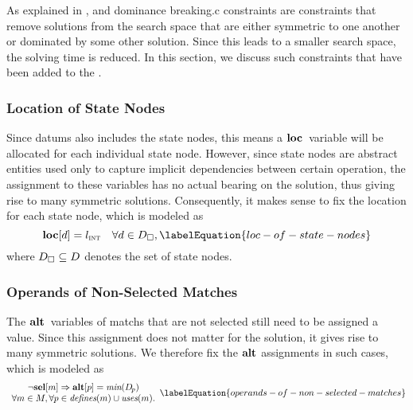 As explained in ,  and \gls{dominance breaking.c} \glspl{constraint} are
\glspl{constraint} that remove \glspl{solution} from the \gls{search space} that
are either symmetric to one another or dominated by some other \gls{solution}.
%
Since this leads to a smaller \gls{search space}, the solving time is reduced.
%
In this section, we discuss such \glspl{constraint} that have been added to the
.


\subsubsection{Location of State Nodes}

Since \glspl{datum} also includes the \glspl{state node}, this means a
$\mVar{loc}$~\gls{variable} will be allocated for each individual \gls{state
  node}.
%
However, since \glspl{state node} are abstract entities used only to capture
implicit dependencies between certain \gls{operation}, the assignment to these
\glspl{variable} has no actual bearing on the \gls{solution}, thus giving rise
to many symmetric \glspl{solution}.
%
Consequently, it makes sense to fix the location for each \gls{state node},
which is modeled as
%
\begin{equation}
  \mVar{loc}[d] = \mIntLocation
  \mQuantSep
  \forall d \in \mStateDataSet,
  \labelEquation{loc-of-state-nodes}
\end{equation}
%
where \mbox{$\mStateDataSet \subseteq \mDataSet$} denotes the set of
\glspl{state node}.


\subsubsection{Operands of Non-Selected Matches}

The $\mVar{alt}$~\glspl{variable} of \glspl{match} that are not selected still
need to be assigned a value.
%
Since this assignment does not matter for the \gls{solution}, it gives rise to
many symmetric \glspl{solution}.
%
We therefore fix the $\mVar{alt}$ assignments in such cases, which is modeled as
%
\begin{equation}
  \begin{array}{c}
    \neg\mVar{sel}[m] \mImp \mVar{alt}[p] = \mMin(\mDataSet[\hspace{-1pt}p]) \\
    \forall m \in \mMatchSet,
    \forall p \in \mDefines(m) \cup \mUses(m).
  \end{array}
  \labelEquation{operands-of-non-selected-matches}
\end{equation}

